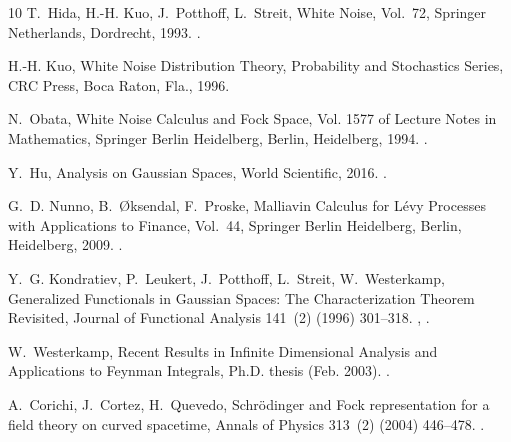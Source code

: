 \documentclass{elsarticle}%
\begin{document}
\begin{thebibliography}{10}
    T.~Hida, H.-H. Kuo, J.~Potthoff, L.~Streit, White {{Noise}}, Vol.~72, Springer Netherlands, Dordrecht, 1993.
    \newblock \href {https://doi.org/10.1007/978-94-017-3680-0} {}.
    
    H.-H. Kuo, White Noise Distribution Theory, Probability and Stochastics Series, CRC Press, Boca Raton, Fla., 1996.
    
    N.~Obata, White {{Noise Calculus}} and {{Fock Space}}, Vol. 1577 of Lecture {{Notes}} in {{Mathematics}}, Springer Berlin Heidelberg, Berlin, Heidelberg, 1994.
    \newblock \href {https://doi.org/10.1007/BFb0073952} {}.
    
    Y.~Hu, Analysis on {{Gaussian Spaces}}, World Scientific, 2016.
    \newblock \href {https://doi.org/10.1142/10094} {}.
    
    G.~D. Nunno, B.~{\O}ksendal, F.~Proske, Malliavin {{Calculus}} for {{L{\'e}vy Processes}} with {{Applications}} to {{Finance}}, Vol.~44, Springer Berlin Heidelberg, Berlin, Heidelberg, 2009.
    \newblock \href {https://doi.org/10.1007/978-3-540-78572-9} {}.
    
    Y.~G. Kondratiev, P.~Leukert, J.~Potthoff, L.~Streit, W.~Westerkamp, Generalized {{Functionals}} in {{Gaussian Spaces}}: {{The Characterization Theorem Revisited}}, Journal of Functional Analysis 141~(2) (1996) 301--318.
    \newblock \href {http://arxiv.org/abs/math/0303054} {}, \href {https://doi.org/10.1006/jfan.1996.0130} {}.
    
    W.~Westerkamp, Recent {{Results}} in {{Infinite Dimensional Analysis}} and {{Applications}} to {{Feynman Integrals}}, Ph.D. thesis (Feb. 2003).
    \newblock \href {http://arxiv.org/abs/math-ph/0302066} {}.
    
    A.~Corichi, J.~Cortez, H.~Quevedo, Schr{\"o}dinger and {{Fock}} representation for a field theory on curved spacetime, Annals of Physics 313~(2) (2004) 446--478.
    \newblock \href {https://doi.org/10.1016/j.aop.2004.05.004} {}.
    

\end{thebibliography}
\end{document}

